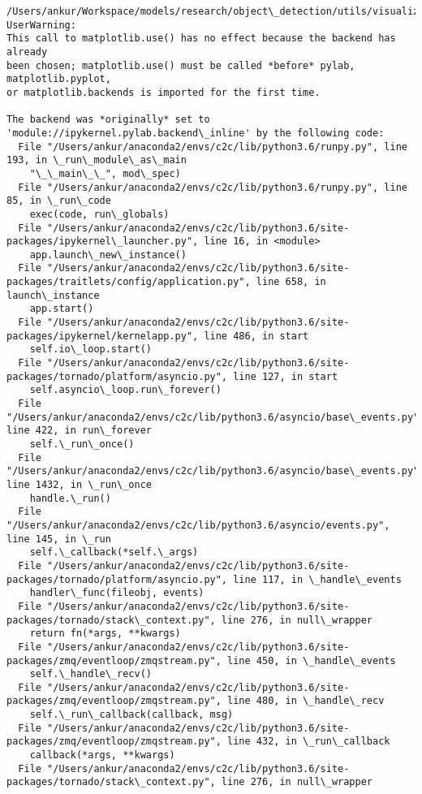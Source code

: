 \documentclass[11pt]{article}
\begin{document}
    \begin{Verbatim}[commandchars=\\\{\}]
/Users/ankur/Workspace/models/research/object\_detection/utils/visualization\_utils.py:25: UserWarning: 
This call to matplotlib.use() has no effect because the backend has already
been chosen; matplotlib.use() must be called *before* pylab, matplotlib.pyplot,
or matplotlib.backends is imported for the first time.

The backend was *originally* set to 'module://ipykernel.pylab.backend\_inline' by the following code:
  File "/Users/ankur/anaconda2/envs/c2c/lib/python3.6/runpy.py", line 193, in \_run\_module\_as\_main
    "\_\_main\_\_", mod\_spec)
  File "/Users/ankur/anaconda2/envs/c2c/lib/python3.6/runpy.py", line 85, in \_run\_code
    exec(code, run\_globals)
  File "/Users/ankur/anaconda2/envs/c2c/lib/python3.6/site-packages/ipykernel\_launcher.py", line 16, in <module>
    app.launch\_new\_instance()
  File "/Users/ankur/anaconda2/envs/c2c/lib/python3.6/site-packages/traitlets/config/application.py", line 658, in launch\_instance
    app.start()
  File "/Users/ankur/anaconda2/envs/c2c/lib/python3.6/site-packages/ipykernel/kernelapp.py", line 486, in start
    self.io\_loop.start()
  File "/Users/ankur/anaconda2/envs/c2c/lib/python3.6/site-packages/tornado/platform/asyncio.py", line 127, in start
    self.asyncio\_loop.run\_forever()
  File "/Users/ankur/anaconda2/envs/c2c/lib/python3.6/asyncio/base\_events.py", line 422, in run\_forever
    self.\_run\_once()
  File "/Users/ankur/anaconda2/envs/c2c/lib/python3.6/asyncio/base\_events.py", line 1432, in \_run\_once
    handle.\_run()
  File "/Users/ankur/anaconda2/envs/c2c/lib/python3.6/asyncio/events.py", line 145, in \_run
    self.\_callback(*self.\_args)
  File "/Users/ankur/anaconda2/envs/c2c/lib/python3.6/site-packages/tornado/platform/asyncio.py", line 117, in \_handle\_events
    handler\_func(fileobj, events)
  File "/Users/ankur/anaconda2/envs/c2c/lib/python3.6/site-packages/tornado/stack\_context.py", line 276, in null\_wrapper
    return fn(*args, **kwargs)
  File "/Users/ankur/anaconda2/envs/c2c/lib/python3.6/site-packages/zmq/eventloop/zmqstream.py", line 450, in \_handle\_events
    self.\_handle\_recv()
  File "/Users/ankur/anaconda2/envs/c2c/lib/python3.6/site-packages/zmq/eventloop/zmqstream.py", line 480, in \_handle\_recv
    self.\_run\_callback(callback, msg)
  File "/Users/ankur/anaconda2/envs/c2c/lib/python3.6/site-packages/zmq/eventloop/zmqstream.py", line 432, in \_run\_callback
    callback(*args, **kwargs)
  File "/Users/ankur/anaconda2/envs/c2c/lib/python3.6/site-packages/tornado/stack\_context.py", line 276, in null\_wrapper

\end{Verbatim}
\end{document}
